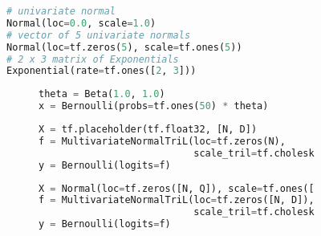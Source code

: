 \documentclass{article} %
\title{}
\author{}
\begin{document}
\maketitle

\begin{figure}[t]
\centering
\begin{lstlisting}[language=python]
# univariate normal
Normal(loc=0.0, scale=1.0)
# vector of 5 univariate normals
Normal(loc=tf.zeros(5), scale=tf.ones(5))
# 2 x 3 matrix of Exponentials
Exponential(rate=tf.ones([2, 3]))
\end{lstlisting}
\caption{}
\end{figure}

\begin{figure}[t]
\begin{subfigure}{0.3\columnwidth}
  \centering
\begin{lstlisting}[language=python]
theta = Beta(1.0, 1.0)
x = Bernoulli(probs=tf.ones(50) * theta)
\end{lstlisting}
\end{subfigure}%
\begin{subfigure}{0.65\columnwidth}
  \centering
  
\end{subfigure}
\caption{}
\end{figure}

\begin{figure}[t]
\begin{subfigure}{1.0\columnwidth}
  \centering
\begin{lstlisting}[language=python]
X = tf.placeholder(tf.float32, [N, D])
f = MultivariateNormalTriL(loc=tf.zeros(N),
                           scale_tril=tf.cholesky(rbf(X)))
y = Bernoulli(logits=f)
\end{lstlisting}
\end{subfigure}%
%   
\caption{}
\end{figure}

\begin{figure}[t]
\begin{subfigure}{1.0\columnwidth}
  \centering
\begin{lstlisting}[language=python]
X = Normal(loc=tf.zeros([N, Q]), scale=tf.ones([N, Q]))
f = MultivariateNormalTriL(loc=tf.zeros([N, D]),
                           scale_tril=tf.cholesky(rbf(X)))
y = Bernoulli(logits=f)
\end{lstlisting}
\end{subfigure}%
%   
\caption{}
\end{figure}
\end{document}

